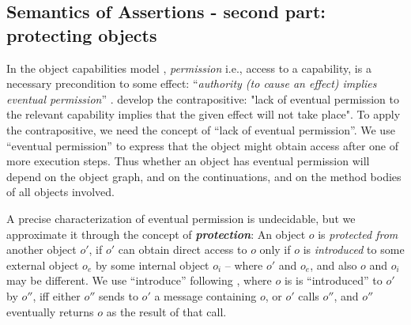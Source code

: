 \subsection{Semantics of Assertions - second part:
protecting objects}  

\label{sect:protect}
{
In the object capabilities model \cite{MillerPhD},
\emph{permission} 
i.e.,  access to a capability, is a necessary precondition to some
effect: ``\emph{authority (to cause an effect) implies eventual permission}'' \cite{permissionAuthority}.
\citet{OOPSLA22} develop the contrapositive:
"lack of eventual
permission to the relevant capability implies that the given effect
will {not} take place".
To apply the contrapositive, we need the concept of ``lack of  eventual permission''.  We use ``eventual permission'' to express that the object might obtain access after one of more execution steps. Thus whether an object has eventual permission will depend on the object graph, and on the continuations, and on the method bodies of all objects involved.  

A precise characterization of eventual permission is undecidable, but we approximate it through the concept of \textbf{\emph{protection}}:
{An object $o$ is \emph{protected  from} another object $o'$, if $o'$ can obtain direct access to   $o$ only if 
$o$ is \emph{introduced} to some external object $o_e$ by some internal object $o_i$ -- where $o'$ and $o_e$, and also $o$ and $o_i$ may be different.  
We  use ``introduce'' following \citet{MillerPhD}, where $o$ is is ``introduced'' to $o'$ by $o''$, iff either $o''$ sends to $o'$ a message containing $o$, 
or $o'$ calls $o''$, and $o''$ eventually returns  $o$ as the result of that call.}
 


}
